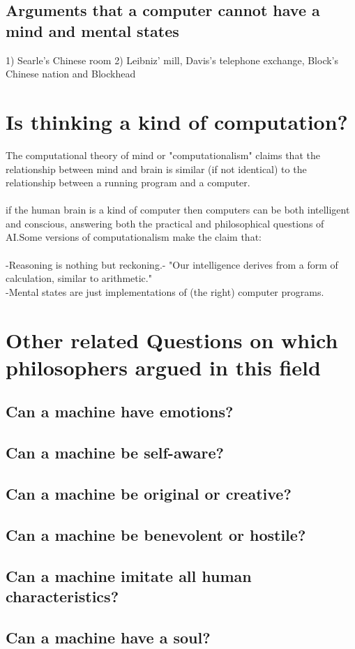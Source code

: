 \documentclass[a4paper]{article}
\begin{document}
    \bigskip
    \subsection{Arguments that a computer cannot have a mind and mental states}
    1) Searle's Chinese room
    2) Leibniz' mill, Davis's telephone exchange, Block's Chinese nation and Blockhead
    \bigskip
    
    \section{Is thinking a kind of computation?}
    The computational theory of mind or "computationalism" claims that the relationship between mind and brain is similar (if not identical) to the relationship between a running program and a computer.\\
    \\if the human brain is a kind of computer then computers can be both intelligent and conscious, answering both the practical and philosophical questions of AI.Some versions of computationalism make the claim that:\\
    \\
    -Reasoning is nothing but reckoning.-  "Our intelligence derives from a form of calculation, similar to arithmetic."\\
    -Mental states are just implementations of (the right) computer programs.\\
    
    \bigskip
    
    \section{Other related Questions on which philosophers argued in this field}
    \subsection{Can a machine have emotions?}
    \subsection{Can a machine be self-aware?}
    \subsection{Can a machine be original or creative?}
    \subsection{Can a machine be benevolent or hostile?}
    \subsection{Can a machine imitate all human characteristics?}
    \subsection{Can a machine have a soul?}
    
    
\end{document}
